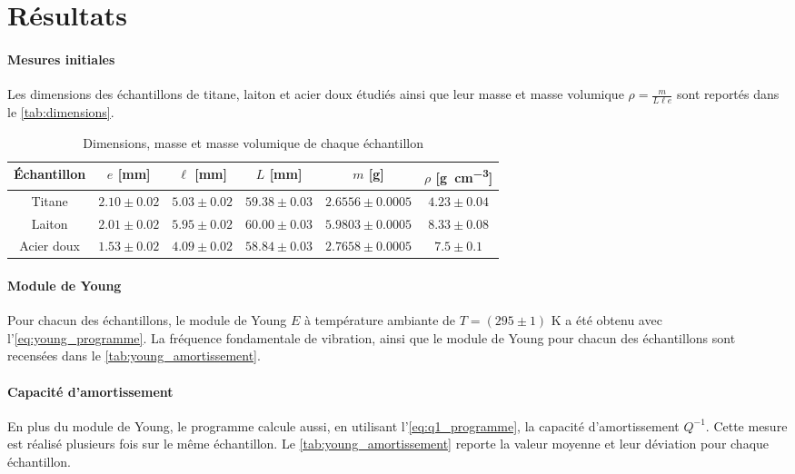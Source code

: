 \section{Résultats}

\paragraph{Mesures initiales} Les dimensions des échantillons de titane, laiton et acier doux étudiés ainsi que leur masse et masse volumique \(\rho = \frac{m}{L \ell e}\) sont reportés dans le \autoref{tab:dimensions}.

\begin{table}[h]
    \centering
    \begin{tabulary}{0.7\linewidth}{c|c c c c c}
        \toprule
        Échantillon & \(e\) [\si{\milli\meter}] & \(\ell\) [\si{\milli\meter}] & \(L\) [\si{\milli\meter}] & \(m\) [\si{\gram}] & \(\rho\) [\si{\gram\per\cubic\centi\meter}] \\
        \midrule
        Titane & \(2.10 \pm 0.02\) & \(5.03 \pm 0.02\) & \(59.38 \pm 0.03\) & \(2.6556 \pm 0.0005\) & \(4.23 \pm 0.04\) \\
        Laiton & \(2.01 \pm 0.02\) & \(5.95 \pm 0.02\) & \(60.00 \pm 0.03\) & \(5.9803 \pm 0.0005\) & \(8.33 \pm 0.08\) \\
        Acier doux & \(1.53 \pm 0.02\) & \(4.09 \pm 0.02\) & \(58.84 \pm 0.03\) & \(2.7658 \pm 0.0005\) & \(7.5 \pm 0.1\) \\
        \bottomrule
    \end{tabulary}
    \caption{Dimensions, masse et masse volumique de chaque échantillon}
    \label{tab:dimensions}
\end{table}

\paragraph{Module de Young} Pour chacun des échantillons, le module de Young \(E\) à température ambiante de \(T = (295 \pm 1)\) \si{\kelvin} a été obtenu avec l'\autoref{eq:young_programme}. La fréquence fondamentale de vibration, ainsi que le module de Young pour chacun des échantillons sont recensées dans le \autoref{tab:young_amortissement}.

\paragraph{Capacité d'amortissement} En plus du module de Young, le programme calcule aussi, en utilisant l'\autoref{eq:q1_programme}, la capacité d'amortissement \(Q^{-1}\). Cette mesure est réalisé plusieurs fois sur le même échantillon. Le \autoref{tab:young_amortissement} reporte la valeur moyenne et leur déviation pour chaque échantillon.

